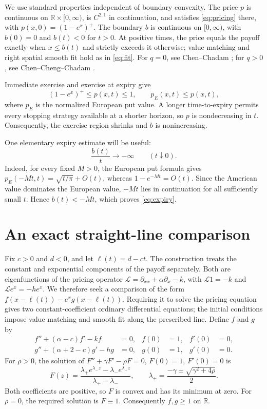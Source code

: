 \documentclass[11pt]{article}
\newcommand{\R}{\mathbb{R}}
\begin{document}
We use standard properties independent of boundary convexity.
The price $p$ is continuous on $\R\times[0,\infty)$, is $C^{2,1}$
in continuation, and satisfies \eqref{eq:pricing} there, with
$p(x,0)=(1-e^x)^+$. The boundary $b$ is continuous on
$[0,\infty)$, with $b(0)=0$ and $b(t)<0$ for $t>0$.
At positive times, the price equals the payoff exactly when
$x\le b(t)$ and strictly exceeds it otherwise; value matching
and right spatial smooth fit hold as in \eqref{eq:fit}.
For $q=0$, see Chen--Chadam
\cite[\S2, especially Theorem~2.3 and Remark~2.2]{CC2007}; for
$q>0$, see Chen--Cheng--Chadam \cite[Theorem~1 and \S3]{CCC2013}.

Immediate exercise and exercise at expiry give
\[
  (1-e^x)^+\le p(x,t)\le1,\qquad p_E(x,t)\le p(x,t),
\]
where $p_E$ is the normalized European put value. A longer
time-to-expiry permits every stopping strategy available at a shorter
horizon, so $p$ is nondecreasing in $t$. Consequently, the exercise
region shrinks and $b$ is nonincreasing.

One elementary expiry estimate will be useful:
\begin{equation}\label{eq:expiry}
  \frac{b(t)}t\longrightarrow-\infty\qquad(t\downarrow0).
\end{equation}
Indeed, for every fixed $M>0$, the European put formula gives
$p_E(-Mt,t)=\sqrt{t/\pi}+O(t)$, whereas
$1-e^{-Mt}=O(t)$. Since the American value dominates the European
value, $-Mt$ lies in continuation for all sufficiently small $t$.
Hence $b(t)<-Mt$, which proves \eqref{eq:expiry}.

\section{An exact straight-line comparison}\label{sec:comparison}

Fix $c>0$ and $d<0$, and let $\ell(t)=d-ct$.
The construction treats the constant and exponential components of the
payoff separately. Both are eigenfunctions of the pricing operator
$\mathcal L=\partial_{xx}+\alpha\partial_x-k$, with
$\mathcal L1=-k$ and $\mathcal Le^x=-he^x$.
We therefore seek a comparison of the form
$f(x-\ell(t))-e^xg(x-\ell(t))$. Requiring it to solve the pricing
equation gives two constant-coefficient ordinary differential equations;
the initial conditions impose value matching and smooth fit along the
prescribed line. Define $f$ and $g$ by
\begin{equation}\label{eq:profiles}
  \begin{aligned}
    f''+(\alpha-c)f'-kf&=0,& f(0)&=1,& f'(0)&=0,\\
    g''+(\alpha+2-c)g'-hg&=0,& g(0)&=1,& g'(0)&=0.
  \end{aligned}
\end{equation}
For $\rho>0$, the solution of
$F''+\gamma F'-\rho F=0$, $F(0)=1$, $F'(0)=0$ is
\[
  F(z)=\frac{\lambda_+e^{\lambda_-z}-\lambda_-e^{\lambda_+z}}
              {\lambda_+-\lambda_-},\qquad
  \lambda_\pm=\frac{-\gamma\pm\sqrt{\gamma^2+4\rho}}2.
\]
Both coefficients are positive, so $F$ is convex and has its minimum
at zero. For $\rho=0$, the required solution is $F\equiv1$.
Consequently $f,g\ge1$ on $\R$.
\end{document}

